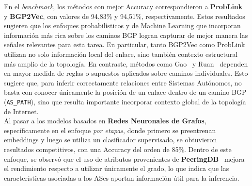 En el \textit{benchmark}, los métodos con mejor Accuracy correspondieron a \textbf{ProbLink} y \textbf{BGP2Vec}, con valores de 94,83\% y 94,51\%, respectivamente. Estos resultados sugieren que los enfoques probabilísticos y de Machine Learning que incorporan información más rica sobre los caminos BGP logran capturar de mejor manera las señales relevantes para esta tarea. En particular, tanto BGP2Vec como ProbLink utilizan no solo información local del enlace, sino también contexto estructural más amplio de la topología. En contraste, métodos como Gao~\cite{InferringASRelatioships2001} y Ruan~\cite{Inferring-Multilateral-Peering} dependen en mayor medida de reglas o supuestos aplicados sobre caminos individuales. Esto sugiere que, para inferir correctamente relaciones entre Sistemas Autónomos, no basta con conocer únicamente la posición de un enlace dentro de un camino BGP (\texttt{AS\_PATH}), sino que resulta importante incorporar contexto global de la topología de Internet.\\


Al pasar a los modelos basados en \textbf{Redes Neuronales de Grafos}, específicamente en el enfoque \textit{por etapas}, donde primero se preentrenan embeddings y luego se utiliza un clasificador supervisado, se obtuvieron resultados competitivos, con una Accuracy del orden de 85\%. Dentro de este enfoque, se observó que el uso de atributos provenientes de \textbf{PeeringDB}~\cite{PeeringDB} mejora el rendimiento respecto a utilizar únicamente el grado, lo que indica que las características asociadas a los ASes aportan información útil para la inferencia.\\



